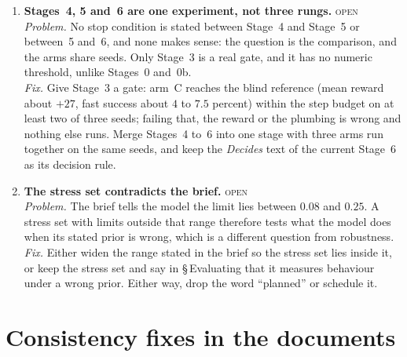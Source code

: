 \documentclass[11pt,a4paper]{article}
\newcommand{\status}[1]{\hfill{\small\textsc{#1}}}
\begin{document}
\begin{enumerate}[leftmargin=1.8em, itemsep=0.8em]
\item \textbf{Stages~4, 5 and~6 are one experiment, not three rungs.}
\status{open}
\label{it:one-experiment}
\\
\emph{Problem.} No stop condition is stated between Stage~4 and Stage~5
or between~5 and~6, and none makes sense: the question is the comparison,
and the arms share seeds. Only Stage~3 is a real gate, and it has no
numeric threshold, unlike Stages~0 and~0b.
\\
\emph{Fix.} Give Stage~3 a gate: arm~C reaches the blind reference (mean
reward about $+27$, fast success about $4$ to $7.5$ percent) within the
step budget on at least two of three seeds; failing that, the reward or the
plumbing is wrong and nothing else runs. Merge Stages~4 to~6 into one
stage with three arms run together on the same seeds, and keep the
\emph{Decides} text of the current Stage~6 as its decision rule.

\item \textbf{The stress set contradicts the brief.} \status{open}
\label{it:stress}
\\
\emph{Problem.} The brief tells the model the limit lies between $0.08$
and $0.25$. A stress set with limits outside that range therefore tests
what the model does when its stated prior is wrong, which is a different
question from robustness.
\\
\emph{Fix.} Either widen the range stated in the brief so the stress set
lies inside it, or keep the stress set and say in \S\,Evaluating that it
measures behaviour under a wrong prior. Either way, drop the word
``planned'' or schedule it.

\end{enumerate}

\section{Consistency fixes in the documents}
\label{sec:docs}
\end{document}
